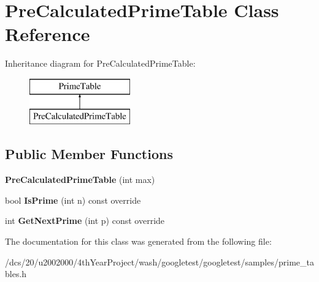 \hypertarget{classPreCalculatedPrimeTable}{}\section{Pre\+Calculated\+Prime\+Table Class Reference}
\label{classPreCalculatedPrimeTable}
Inheritance diagram for Pre\+Calculated\+Prime\+Table\+:\begin{figure}[H]
\begin{center}
\leavevmode
\includegraphics[height=2.000000cm]{classPreCalculatedPrimeTable}
\end{center}
\end{figure}
\subsection*{Public Member Functions}
\begin{DoxyCompactItemize}
\item 
\mbox{\label{classPreCalculatedPrimeTable_a6bb947504421e31da70d2c71576be350}} 
{\bfseries Pre\+Calculated\+Prime\+Table} (int max)
\item 
\mbox{\label{classPreCalculatedPrimeTable_a62be946777f7f98bbfc01edc0f15a4bb}} 
bool {\bfseries Is\+Prime} (int n) const override
\item 
\mbox{\label{classPreCalculatedPrimeTable_a0b99de0a790db9f0cc2b3cd4b527fd5a}} 
int {\bfseries Get\+Next\+Prime} (int p) const override
\end{DoxyCompactItemize}


The documentation for this class was generated from the following file\+:\begin{DoxyCompactItemize}
\item 
/dcs/20/u2002000/4th\+Year\+Project/wash/googletest/googletest/samples/prime\+\_\+tables.\+h\end{DoxyCompactItemize}
